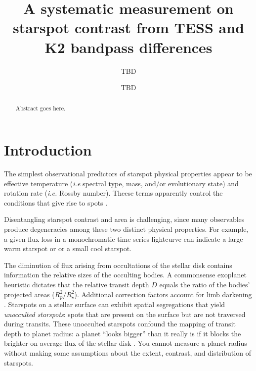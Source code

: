 \documentclass[twocolumn]{aastex631}
\begin{document}
\title{A systematic measurement on starspot contrast from TESS and K2
  bandpass differences}

\author{TBD}

\author{TBD}


\begin{abstract}

  Abstract goes here.

\end{abstract}


\section{Introduction}\label{sec:intro}


The simplest observational predictors of starspot physical properties appear to be effective temperature (\emph{i.e} spectral type, mass, and/or evolutionary state) and rotation rate (\emph{i.e.} Rossby number).  Theese terms apparently control the conditions that give rise to spots .

Disentangling starspot contrast and area is challenging, since many observables produce degeneracies among these two distinct physical properties.  For example, a given flux loss in a monochromatic time series lightcurve can indicate a large warm starspot or or a small cool starspot.

The diminution of flux arising from occultations of the stellar disk contains information the relative sizes of the occulting bodies.  A commonsense exoplanet heuristic dictates that the relative transit depth $D$ equals the ratio of the bodies' projected areas ($R_p^2/R_\star^2$).  Additional correction factors account for limb darkening \citep{2002ApJ...580L.171M}.  Starspots on a stellar surface can exhibit spatial segregations
that yield \emph{unocculted starspots}: spots that are present on the surface but are not traversed during transits.  These unocculted starspots confound the mapping of transit depth to planet radius: a planet ``looks bigger'' than it really is if it blocks the brighter-on-average flux of the stellar disk \citep{2018AJ....156...91M}.  You cannot measure a planet radius without making some assumptions about the extent, contrast, and distribution of starspots.
\end{document}
